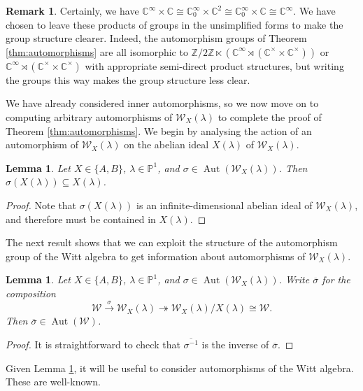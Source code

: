 \documentclass[11pt, svgnames]{amsart}
\newcommand{\ZZ}{\mathbb{Z}}
\newcommand{\CC}{\mathbb{C}}
\newcommand{\PP}{\mathbb{P}}
\newcommand{\W}{\mathcal{W}}
\DeclareMathOperator{\Aut}{Aut}
\newtheorem{lemma}[proposition]{Lemma}
\theoremstyle{definition}
\newtheorem{remark}[proposition]{Remark}
\begin{document}
\begin{remark}
    Certainly, we have $\CC^\infty \times \CC \cong \CC_0^\infty \times \CC^2 \cong \CC^\infty_0 \times \CC \cong \CC^\infty$. We have chosen to leave these products of groups in the unsimplified forms to make the group structure clearer. Indeed, the automorphism groups of Theorem \ref{thm:automorphisms} are all isomorphic to $\ZZ/2\ZZ \ltimes (\CC^\infty \rtimes (\CC^\times \times \CC^\times))$ or $\CC^\infty \rtimes (\CC^\times \times \CC^\times)$ with appropriate semi-direct product structures, but writing the groups this way makes the group structure less clear.
\end{remark}

We have already considered inner automorphisms, so we now move on to computing arbitrary automorphisms of $\W_X(\lambda)$ to complete the proof of Theorem \ref{thm:automorphisms}. We begin by analysing the action of an automorphism of $\W_X(\lambda)$ on the abelian ideal $X(\lambda)$ of $\W_X(\lambda)$.

\begin{lemma}\label{lem:automorphism preserves X}
    Let $X \in \{A,B\}$, $\lambda \in \PP^1$, and $\sigma \in \Aut(\W_X(\lambda))$. Then $\sigma(X(\lambda)) \subseteq X(\lambda)$.
\end{lemma}
\begin{proof}
    Note that $\sigma(X(\lambda))$ is an infinite-dimensional abelian ideal of $\W_X(\lambda)$, and therefore must be contained in $X(\lambda)$.
\end{proof}

The next result shows that we can exploit the structure of the automorphism group of the Witt algebra to get information about automorphisms of $\W_X(\lambda)$.

\begin{lemma}\label{lem:induced Witt automorphism}
    Let $X \in \{A,B\}$, $\lambda \in \PP^1$, and $\sigma \in \Aut(\W_X(\lambda))$. Write $\overline{\sigma}$ for the composition
    $$\W \xrightarrow{\sigma} \W_X(\lambda) \twoheadrightarrow \W_X(\lambda)/X(\lambda) \cong \W.$$
    Then $\overline{\sigma} \in \Aut(\W)$.
\end{lemma}
\begin{proof}
    It is straightforward to check that $\overline{\sigma^{-1}}$ is the inverse of $\overline{\sigma}$.
\end{proof}

Given Lemma \ref{lem:induced Witt automorphism}, it will be useful to consider automorphisms of the Witt algebra. These are well-known.
\end{document}
